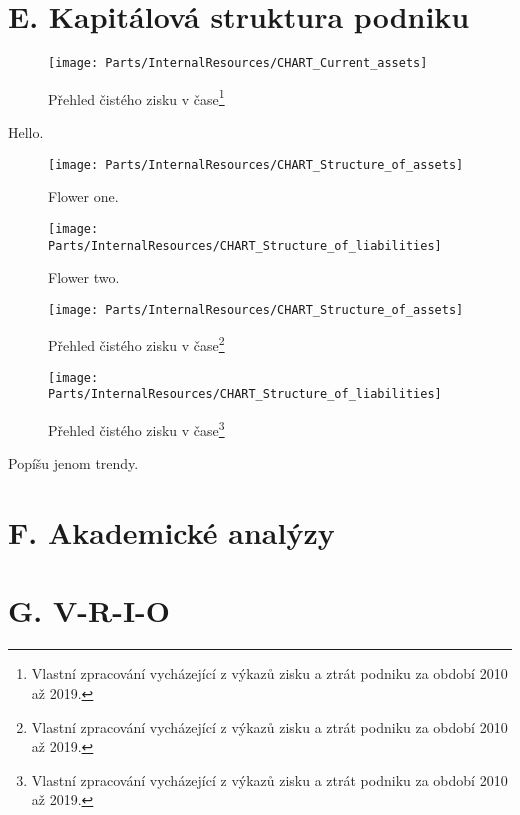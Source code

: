 


\section*{E. Kapitálová struktura podniku}
\label{sec:Kapitalova struktura podniku}

\begin{figure}[!hbtp]
	\centering
	\texttt{[image: Parts/InternalResources/CHART\_Current\_assets]}
	\caption[Přehled čistého zisku v čase]{Přehled čistého zisku v čase\footnote{Vlastní zpracování vycházející z výkazů zisku a ztrát podniku za období 2010 až 2019.}}
	\label{fig:Prehled cisteho zisku v case2}
\end{figure}

\newpage

Hello.

\begin{figure}[!htbp]
  \centering
  \begin{minipage}[b]{0.49\textwidth}
    \texttt{[image: Parts/InternalResources/CHART\_Structure\_of\_assets]}
    \caption{Flower one.}
  \end{minipage}
  \hfill
  \begin{minipage}[b]{0.49\textwidth}
    \texttt{[image: Parts/InternalResources/CHART\_Structure\_of\_liabilities]}
    \caption{Flower two.}
  \end{minipage}
\end{figure}

\begin{figure}[!hbtp]
	\centering
	\texttt{[image: Parts/InternalResources/CHART\_Structure\_of\_assets]}
	\caption[Přehled čistého zisku v čase]{Přehled čistého zisku v čase\footnote{Vlastní zpracování vycházející z výkazů zisku a ztrát podniku za období 2010 až 2019.}}
	\label{fig:Prehled cisteho zisku v case3}
\end{figure}

\begin{figure}[!hbtp]
	\centering
	\texttt{[image: Parts/InternalResources/CHART\_Structure\_of\_liabilities]}
	\caption[Přehled čistého zisku v čase]{Přehled čistého zisku v čase\footnote{Vlastní zpracování vycházející z výkazů zisku a ztrát podniku za období 2010 až 2019.}}
	\label{fig:Prehled cisteho zisku v case4}
\end{figure}

\newpage

Popíšu jenom trendy.

\section*{F. Akademické analýzy}
\label{sec:Akademicke analyzy}

\section*{G. V-R-I-O}
\label{sec:V-R-I-O}
